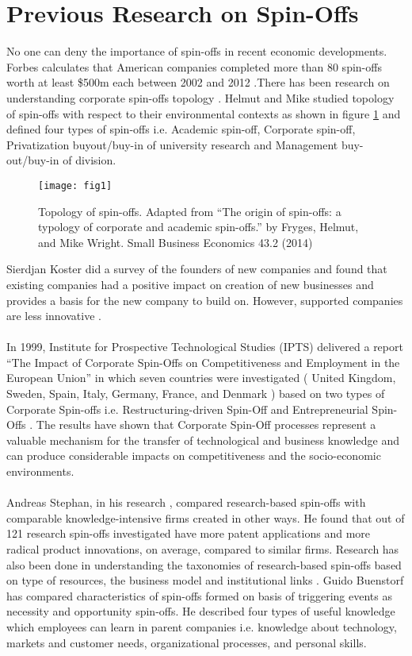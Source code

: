 \section{Previous Research on Spin-Offs\label{sec:previous_r_spin}}
No one can deny the importance of spin-offs in recent economic developments. Forbes calculates
that American companies completed more than 80 spin-offs worth at least \$500m each between
2002 and 2012 \cite{12}.There has been research on understanding corporate spin-offs topology \cite{23}. 
Helmut and Mike \cite{24} studied topology of spin-offs with respect to their environmental contexts as
shown in figure \ref{fig1} and defined four types of spin-offs i.e. Academic spin-off, Corporate spin-off,
Privatization buyout/buy-in of university research and Management buy-out/buy-in of division.

\begin{figure}[htb]
	\centering
	\texttt{[image: fig1]}
	\caption{Topology of spin-offs. Adapted from ``The origin of spin-offs: a typology of corporate and academic spin-offs.'' by Fryges, Helmut, and Mike Wright. Small Business Economics 43.2 (2014)}
	\label{fig1}
\end{figure}

Sierdjan Koster did a survey of the founders of new companies and found that existing companies
had a positive impact on creation of new businesses and provides a basis for the new company to
build on. However, supported companies are less innovative \cite{50}.
\\
\\
In 1999, Institute for Prospective Technological Studies (IPTS) delivered a report ``The Impact of
Corporate Spin-Offs on Competitiveness and Employment in the European Union'' in which seven
countries were investigated ( United Kingdom, Sweden, Spain, Italy, Germany, France, and
Denmark ) based on two types of Corporate Spin-offs i.e. Restructuring-driven Spin-Off and
Entrepreneurial Spin-Offs \cite{26}. The results have shown that Corporate Spin-Off processes represent
a valuable mechanism for the transfer of technological and business knowledge and can produce
considerable impacts on competitiveness and the socio-economic environments. 
\\
\\
Andreas Stephan, in his research \cite{22}, compared research-based spin-offs with comparable knowledge-intensive firms
created in other ways. He found that out of 121 research spin-offs investigated have more patent
applications and more radical product innovations, on average, compared to similar firms.
Research has also been done in understanding the taxonomies of research-based spin-offs based on
type of resources, the business model and institutional links \cite{27}. Guido Buenstorf \cite{28} has compared
characteristics of spin-offs formed on basis of triggering events as necessity and opportunity spin-offs. He described four types of useful knowledge which employees can learn in parent
companies i.e. knowledge about technology, markets and customer needs, organizational
processes, and personal skills.

